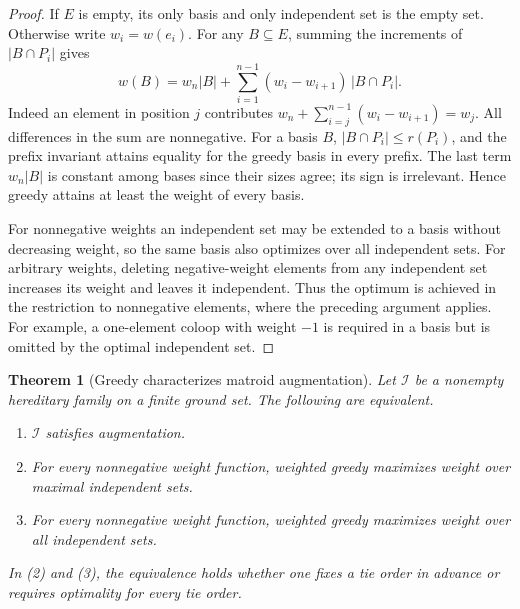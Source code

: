 \documentclass[11pt,oneside,openany]{book}
\theoremstyle{plain}
\newtheorem{theorem}{Theorem}[chapter]
\theoremstyle{definition}
\theoremstyle{remark}
\begin{document}
\begin{proof}
If \(E\) is empty, its only basis and only independent
set is the empty set. Otherwise write \(w_i=w(e_i)\).
For any \(B\subseteq E\), summing the increments of
\(|B\cap P_i|\) gives
\[
 w(B)
 = w_n|B|+\sum_{i=1}^{n-1}
     (w_i-w_{i+1})\,|B\cap P_i| .
\]
Indeed an element in position \(j\) contributes
\(w_n+\sum_{i=j}^{n-1}(w_i-w_{i+1})=w_j\).
All differences in the sum are nonnegative.
For a basis \(B\), \(|B\cap P_i|\le r(P_i)\), and the
prefix invariant attains equality for the greedy basis
in every prefix. The last term \(w_n|B|\) is constant
among bases since their sizes agree; its sign is
irrelevant. Hence greedy attains at least the weight
of every basis.

For nonnegative weights an independent set may be
extended to a basis without decreasing weight, so the
same basis also optimizes over all independent sets.
For arbitrary weights, deleting negative-weight elements
from any independent set increases its weight and leaves
it independent. Thus the optimum is achieved in the
restriction to nonnegative elements, where the preceding
argument applies. For example, a one-element coloop with
weight \(-1\) is required in a basis but is omitted by the
optimal independent set.
\end{proof}

\begin{theorem}[Greedy characterizes matroid augmentation]
\label{p204:W80}
Let \(\mathcal I\) be a nonempty hereditary family on a
finite ground set. The following are equivalent.
\begin{enumerate}
\item \(\mathcal I\) satisfies augmentation.
\item For every nonnegative weight function, weighted
greedy maximizes weight over maximal independent sets.
\item For every nonnegative weight function, weighted
greedy maximizes weight over all independent sets.
\end{enumerate}
In (2) and (3), the equivalence holds whether one fixes a
tie order in advance or requires optimality for every tie
order.
\end{theorem}
\end{document}
